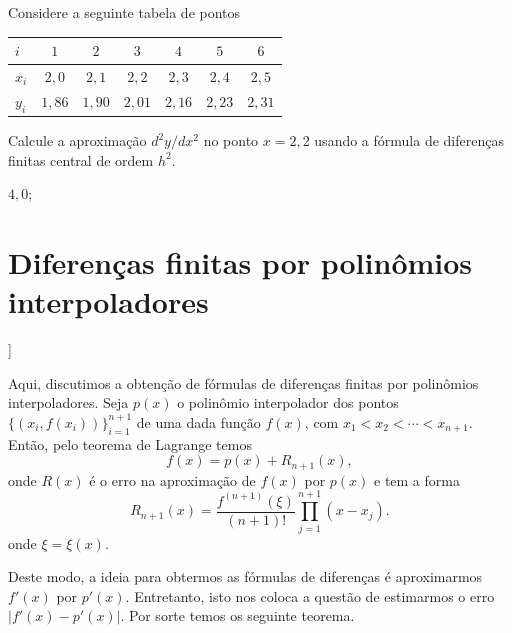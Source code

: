 \begin{exer}\label{exer:d2fc_tab}
  Considere a seguinte tabela de pontos
  \begin{center}
    \begin{tabular}{l|cccccc}
      $i$ & $1$ & $2$ & $3$ & $4$ & $5$ & $6$ \\\hline
      $x_i$ & $2,0$ & $2,1$ & $2,2$ & $2,3$ & $2,4$ & $2,5$ \\
      $y_i$ & $1,86$ & $1,90$ & $2,01$ & $2,16$ & $2,23$ & $2,31$ \\\hline
    \end{tabular}
  \end{center}
Calcule a aproximação $d^2y/dx^2$ no ponto $x=2,2$ usando a fórmula de diferenças finitas central de ordem $h^2$.
\end{exer}
\begin{resp}
  $4,0$; 
\end{resp}

\section{Diferenças finitas por polinômios interpoladores}\label{cap_deriv_sec_df_pi}

\begin{flushleft}
  [[tag:revisar]]
\end{flushleft}

Aqui, discutimos a obtenção de fórmulas de diferenças finitas por polinômios interpoladores. Seja $p(x)$ o polinômio interpolador dos pontos $\{(x_i,f(x_i))\}_{i=1}^{n+1}$ de uma dada função $f(x)$, com $x_1 < x_2 < \cdots < x_{n+1}$. Então, pelo teorema de Lagrange temos
\begin{equation}
  f(x) = p(x) + R_{n+1}(x),
\end{equation}
onde $R(x)$ é o erro na aproximação de $f(x)$ por $p(x)$ e tem a forma
\begin{equation}
  R_{n+1}(x) = \frac{f^{(n+1)}(\xi)}{(n+1)!}\prod_{j=1}^{n+1}(x-x_j).
\end{equation}
onde $\xi = \xi(x)$.

Deste modo, a ideia para obtermos as fórmulas de diferenças é aproximarmos $f'(x)$ por $p'(x)$. Entretanto, isto nos coloca a questão de estimarmos o erro $|f'(x) - p'(x)|$. Por sorte temos os seguinte teorema.

